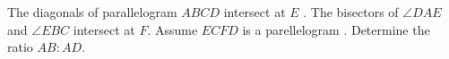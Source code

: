 The diagonals of parallelogram $ABCD$ intersect at $E$ . The bisectors of $\angle DAE$ and $\angle EBC$ intersect at $F$. Assume $ECFD$ is a parellelogram . Determine the ratio $AB:AD$.